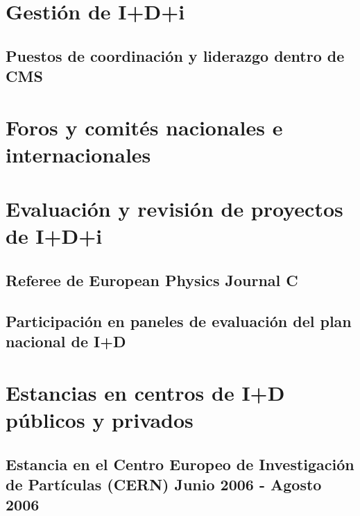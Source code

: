 \documentclass[a4paper, 11pt, twoside, openright]{report}
\begin{document}
\section{Gestión de I+D+i}

\subsection{Puestos de coordinación y liderazgo dentro de CMS}





\section{Foros y comités nacionales e internacionales}




\section{Evaluación y revisión de proyectos de I+D+i}

\subsection{Referee de European Physics Journal C}



\subsection{Participación en paneles de evaluación del plan nacional de I+D}



\section{Estancias en centros de I+D públicos y privados}
\subsection{Estancia en el Centro Europeo de Investigación de Partículas (CERN) Junio 2006 - Agosto 2006}

\end{document}
